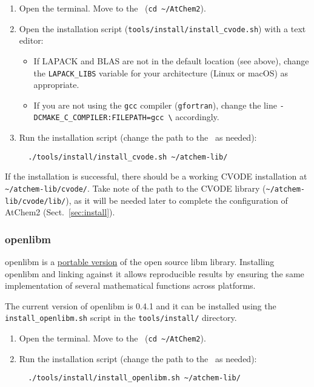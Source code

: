 \begin{enumerate}
\item Open the terminal. Move to the \maindir\ (\verb|cd ~/AtChem2|).
\item Open the installation script (\texttt{tools/install/install\_cvode.sh})
  with a text editor:
  \begin{itemize}
  \item If LAPACK and BLAS are not in the default location (see
    above), change the \texttt{LAPACK\_LIBS} variable for your
    architecture (Linux or macOS) as appropriate.
  \item If you are not using the \texttt{gcc} compiler
    (\texttt{gfortran}), change the line
    \texttt{-DCMAKE\_C\_COMPILER:FILEPATH=gcc \textbackslash}
    accordingly.
  \end{itemize}
\item Run the installation script (change the path to the \depdir\ as
  needed):
  \begin{verbatim}
  ./tools/install/install_cvode.sh ~/atchem-lib/
  \end{verbatim}
\end{enumerate}

If the installation is successful, there should be a working CVODE
installation at \texttt{\textasciitilde/atchem-lib/cvode/}. Take note
of the path to the CVODE library (\texttt{\textasciitilde/atchem-lib/cvode/lib/}),
as it will be needed later to complete the configuration of AtChem2
(Sect.~\ref{sec:install}).

\subsubsection{openlibm}

openlibm is a \href{https://openlibm.org/}{portable version} of the
open source libm library. Installing openlibm and linking against it
allows reproducible results by ensuring the same implementation of
several mathematical functions across platforms.

The current version of openlibm is 0.4.1 and it can be installed using
the \texttt{install\_openlibm.sh} script in the \texttt{tools/install/}
directory.

\begin{enumerate}
\item Open the terminal. Move to the \maindir\ (\verb|cd ~/AtChem2|).
\item Run the installation script (change the path to the \depdir\ as
  needed):
  \begin{verbatim}
  ./tools/install/install_openlibm.sh ~/atchem-lib/
  \end{verbatim}
\end{enumerate}

